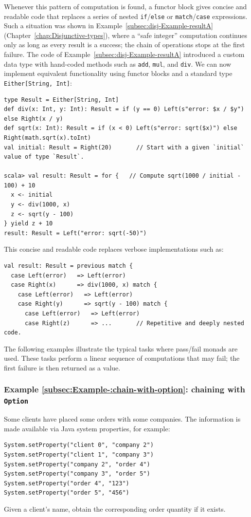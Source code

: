 Whenever this pattern of computation is found, a functor block gives
concise and readable code that replaces a series of nested \lstinline!if!/\lstinline!else!
or \lstinline!match!/\lstinline!case! expressions. Such a situation
was shown in Example~\ref{subsec:disj-Example-resultA} (Chapter~\ref{chap:Disjunctive-types}),
where a \textsf{``}safe integer\textsf{''} computation continues only as long as every
result is a success; the chain of operations stops at the first failure.
The code of Example~\ref{subsec:disj-Example-resultA} introduced
a custom data type with hand-coded methods such as \lstinline!add!,
\lstinline!mul!, and \lstinline!div!. We can now implement equivalent
functionality using functor blocks and a standard type \lstinline!Either[String, Int]!:
\begin{lstlisting}
type Result = Either[String, Int]
def div(x: Int, y: Int): Result = if (y == 0) Left(s"error: $x / $y") else Right(x / y)
def sqrt(x: Int): Result = if (x < 0) Left(s"error: sqrt($x)") else Right(math.sqrt(x).toInt)
val initial: Result = Right(20)       // Start with a given `initial` value of type `Result`.

scala> val result: Result = for {   // Compute sqrt(1000 / initial - 100) + 10
  x <- initial
  y <- div(1000, x)
  z <- sqrt(y - 100)
} yield z + 10
result: Result = Left("error: sqrt(-50)")
\end{lstlisting}
This concise and readable code replaces verbose implementations such
as:
\begin{lstlisting}
val result: Result = previous match {
  case Left(error)   => Left(error)
  case Right(x)      => div(1000, x) match {
    case Left(error)   => Left(error)
    case Right(y)      => sqrt(y - 100) match {
      case Left(error)   => Left(error)
      case Right(z)      => ...       // Repetitive and deeply nested code.
\end{lstlisting}

The following examples illustrate the typical tasks where pass/fail
monads are used. These tasks perform a linear sequence of computations
that may fail; the first failure is then returned as a value.

\subsubsection{Example \label{subsec:Example-:chain-with-option}\ref{subsec:Example-:chain-with-option}:
chaining with \texttt{Option}}

Some clients have placed some orders with some companies. The information
is made available via Java system properties, for example:
\begin{lstlisting}
System.setProperty("client 0", "company 2")
System.setProperty("client 1", "company 3")
System.setProperty("company 2", "order 4")
System.setProperty("company 3", "order 5")
System.setProperty("order 4", "123")
System.setProperty("order 5", "456")
\end{lstlisting}
Given a client\textsf{'}s name, obtain the corresponding order quantity if
it exists.

